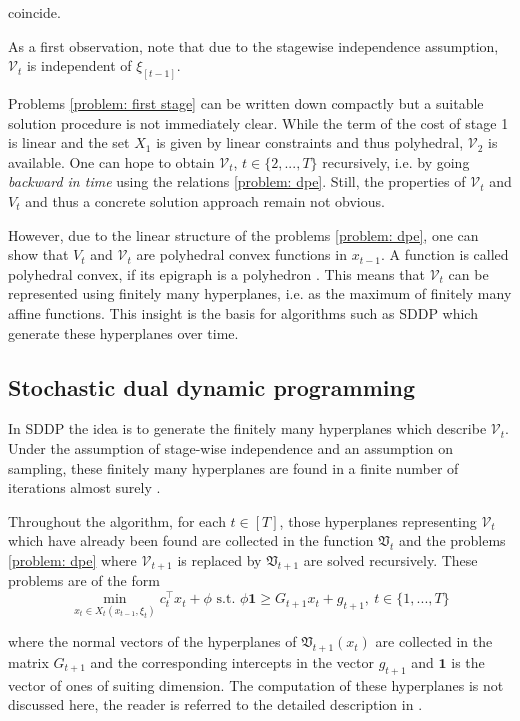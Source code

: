 \documentclass[a4paper,12pt]{article}
\begin{document}
coincide.

As a first observation, note that due to the stagewise independence assumption, $\mathcal{V}_t$ is independent of $\xi_{[t-1]}$.

Problems \ref{problem: first stage} can be written down compactly but a suitable solution procedure is not immediately clear. While the term of the cost of stage 1 is linear and the set $X_1$ is given by linear constraints and thus polyhedral, $\mathcal{V}_2$ is available.
One can hope to obtain $\mathcal{V}_t$, $t\in \{2,...,T\}$ recursively, i.e. by going \emph{backward in time} using the relations \eqref{problem: dpe}.
Still, the properties of $\mathcal{V}_{t}$ and $V_t$ and thus a concrete solution approach remain not obvious.

However, due to the linear structure of the problems \eqref{problem: dpe}, one can show that $V_t$ and $\mathcal{V}_t$ are polyhedral convex functions \cite{shapiro2009lectures} in $x_{t-1}$.
A function is called polyhedral convex, if its epigraph is a polyhedron \cite{rockafellar1997convex}. This means that $\mathcal{V}_t$ can be represented using finitely many hyperplanes, i.e. as the maximum of finitely many affine functions. This insight is the basis for algorithms such as SDDP which generate these hyperplanes over time.


\subsection{Stochastic dual dynamic programming}
In SDDP the idea is to generate the finitely many hyperplanes which describe $\mathcal{V}_t$. Under the assumption of stage-wise independence and an assumption on sampling, these finitely many hyperplanes are found in a finite number of iterations almost surely \cite{shapiro2011analysis}.

Throughout the algorithm, for each $t\in [T]$, those hyperplanes representing $\mathcal{V}_t$ which have already been found are collected in the function 
$\mathfrak{V}_t$ and the problems \eqref{problem: dpe} where $\mathcal{V}_{t+1}$ is replaced by $\mathfrak{V}_{t+1}$ are solved recursively. 
These problems are of the form
\begin{equation}
    \min_{x_t \in  X_t(x_{t-1}, \xi_t)} c_t^\top x_t + \phi \text{ s.t. } \phi \mathbf{1} \geq G_{t+1}x_t + g_{t+1},\ t \in \{1, ..., T\}
    \label{problem: backward}
\end{equation}

where the normal vectors of the hyperplanes of $\mathfrak{V}_{t+1}(x_t)$ are collected in the matrix $G_{t+1}$ and the corresponding intercepts in the vector $g_{t+1}$ and $\mathbf{1}$ is the vector of ones of suiting dimension. 
The computation of these hyperplanes is not discussed here, the reader is referred to the detailed description in \cite{fuellner2021stochastic}.
\end{document}
